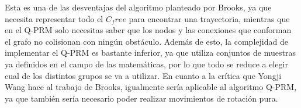 Esta es una de las desventajas del algoritmo planteado por Brooks, ya que necesita representar todo el $C_free$ para encontrar una trayectoria, mientras que en el Q-PRM solo necesitas saber que los nodos y las conexiones que conforman el grafo no colisionan con ningún obstáculo. Además de esto, la complejidad de implementar el Q-PRM es bastante inferior, ya que utiliza conjuntos de muestras ya definidos en el campo de las matemáticas, por lo que todo se reduce a elegir cual de los distintos grupos se va a utilizar. En cuanto a la crítica que Yongji Wang hace al trabajo de Brooks, igualmente sería aplicable al algoritmo Q-PRM, ya que también sería necesario poder realizar movimientos de rotación pura.